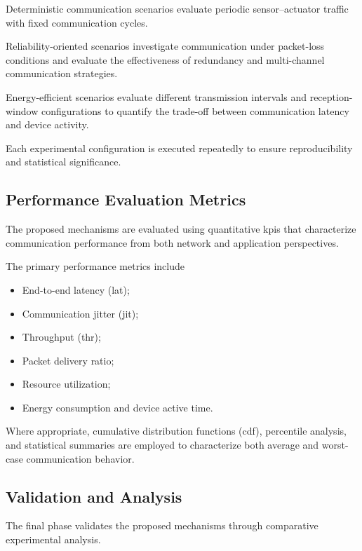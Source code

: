 \documentclass[12pt,a4paper]{article}
\begin{document}
Deterministic communication scenarios evaluate periodic sensor--actuator traffic with fixed communication cycles.

Reliability-oriented scenarios investigate communication under packet-loss conditions and evaluate the effectiveness of redundancy and multi-channel communication strategies.

Energy-efficient scenarios evaluate different transmission intervals and reception-window configurations to quantify the trade-off between communication latency and device activity.

Each experimental configuration is executed repeatedly to ensure reproducibility and statistical significance.


\subsection{Performance Evaluation Metrics}

The proposed mechanisms are evaluated using quantitative \glspl{kpi} that characterize communication performance from both network and application perspectives.

The primary performance metrics include

\begin{itemize}
\item End-to-end latency (\gls{lat});
\item Communication jitter (\gls{jit});
\item Throughput (\gls{thr});
\item Packet delivery ratio;
\item Resource utilization;
\item Energy consumption and device active time.
\end{itemize}

Where appropriate, cumulative distribution functions (\gls{cdf}), percentile analysis, and statistical summaries are employed to characterize both average and worst-case communication behavior.


\subsection{Validation and Analysis}

The final phase validates the proposed mechanisms through comparative experimental analysis.
\end{document}
